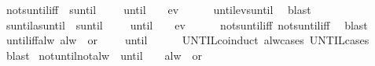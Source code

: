 \begin{isabellebody}
%
\endisadelimproof
\isanewline
{}\isamarkupfalse%
\ not{\isacharunderscore}suntil{\isacharunderscore}iff{\isacharunderscore}{}{\isacharcolon}\ {\isachardoublequoteopen}{\isasymnot}{\isacharparenleft}{\isasymphi}\ suntil\ {\isasympsi}{\isacharparenright}\ {\isasymomega}\ {\isasymLongrightarrow}\ {\isasymnot}{\isacharparenleft}{\isasymphi}\ until\ {\isasympsi}{\isacharparenright}\ {\isasymomega}\ {\isasymor}\ {\isasymnot}ev\ {\isasympsi}\ {\isasymomega}{\isachardoublequoteclose}\isanewline
%
\isadelimproof
\ \ %
\endisadelimproof
%
\isatagproof
{}\isamarkupfalse%
\ until{\isacharunderscore}ev{\isacharunderscore}suntil\ \isamarkupfalse%
\ blast%
\endisatagproof
{\isafoldproof}%
%
\isadelimproof
\isanewline
%
\endisadelimproof
\isanewline
{}\isamarkupfalse%
\ suntil{\isacharunderscore}as{\isacharunderscore}until{\isacharcolon}\ {\isachardoublequoteopen}{\isacharparenleft}{\isasymphi}\ suntil\ {\isasympsi}{\isacharparenright}\ {\isasymomega}\ {\isacharequal}\ {\isacharparenleft}{\isacharparenleft}{\isasymphi}\ until\ {\isasympsi}{\isacharparenright}\ {\isasymomega}\ {\isasymand}\ ev\ {\isasympsi}\ {\isasymomega}{\isacharparenright}{\isachardoublequoteclose}\isanewline
%
\isadelimproof
\ \ %
\endisadelimproof
%
\isatagproof
{}\isamarkupfalse%
\ not{\isacharunderscore}suntil{\isacharunderscore}iff\ not{\isacharunderscore}suntil{\isacharunderscore}iff{\isacharunderscore}{}\ \isamarkupfalse%
\ blast%
\endisatagproof
{\isafoldproof}%
%
\isadelimproof
\isanewline
%
\endisadelimproof
\isanewline
\isanewline
{}\isamarkupfalse%
\ until{\isacharunderscore}iff{\isacharunderscore}alw{\isacharcolon}\ {\isachardoublequoteopen}alw\ {\isacharparenleft}{\isasymphi}\ or\ {\isasympsi}{\isacharparenright}\ {\isasymomega}\ {\isasymLongrightarrow}\ {\isacharparenleft}{\isasymphi}\ until\ {\isasympsi}{\isacharparenright}\ {\isasymomega}{\isachardoublequoteclose}\isanewline
%
\isadelimproof
\ \ %
\endisadelimproof
%
\isatagproof
{}\isamarkupfalse%
\ UNTIL{\isachardot}coinduct\ alw{\isachardot}cases\ UNTIL{\isachardot}cases\isanewline
\ \ \isamarkupfalse%
\ blast%
\endisatagproof
{\isafoldproof}%
%
\isadelimproof
\isanewline
%
\endisadelimproof
\isanewline
{}\isamarkupfalse%
\ not{\isacharunderscore}until{\isacharunderscore}not{\isacharunderscore}alw{\isacharcolon}\ {\isachardoublequoteopen}{\isasymnot}{\isacharparenleft}{\isasymphi}\ until\ {\isasympsi}{\isacharparenright}\ {\isasymomega}\ {\isasymLongrightarrow}\ {\isasymnot}alw\ {\isacharparenleft}{\isasymphi}\ or\ {\isasympsi}{\isacharparenright}\ {\isasymomega}{\isachardoublequoteclose}\isanewline

\end{isabellebody}
